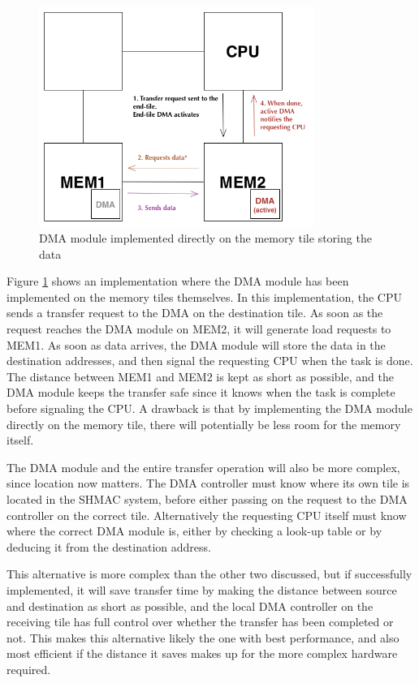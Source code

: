 \begin{figure}[h!]
    \centering
    \includegraphics[width=0.8\textwidth]{Figures/DMA/DMASHMAC3}
    \caption{DMA module implemented directly on the memory tile storing the data}
    \label{fig:DMASHMAC3}
\end{figure}
 
Figure \ref{fig:DMASHMAC3} shows an implementation where the DMA module has been implemented on the memory tiles themselves.
In this implementation, the CPU sends a transfer request to the DMA on the destination tile.
As soon as the request reaches the DMA module on MEM2, it will generate load requests to MEM1.
As soon as data arrives, the DMA module will store the data in the destination addresses, and then signal the requesting CPU when the task is done.
The distance between MEM1 and MEM2 is kept as short as possible, and the DMA module keeps the transfer safe since it knows when the task is complete before signaling the CPU.
A drawback is that by implementing the DMA module directly on the memory tile, there will potentially be less room for the memory itself.

The DMA module and the entire transfer operation will also be more complex, since location now matters.
The DMA controller must know where its own tile is located in the SHMAC system, before either passing on the request to the DMA controller on the correct tile.
Alternatively the requesting CPU itself must know where the correct DMA module is, either by checking a look-up table or by deducing it from the destination address.

This alternative is more complex than the other two discussed, but if successfully implemented, it will save transfer time by making the distance between source and destination as short as possible, and the local DMA controller on the receiving tile has full control over whether the transfer has been completed or not.
This makes this alternative likely the one with best performance, and also most efficient if the distance it saves makes up for the more complex hardware required.

